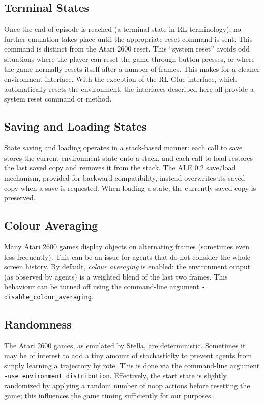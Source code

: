 \documentclass[12pt]{article}
\begin{document}
\subsection{Terminal States}

Once the end of episode is reached (a terminal state in RL terminology), no further emulation 
takes place until the appropriate reset command is sent. This command is distinct from the Atari 
2600 reset. This ``system reset'' avoids odd situations where the player can reset the game
through button presses, or where the game normally resets itself after a number of frames. This 
makes for a cleaner environment interface. With the exception of the RL-Glue interface, which 
automatically resets the environment, the interfaces described here all provide a system reset
command or method.

\subsection{Saving and Loading States}

State saving and loading operates in a stack-based manner: each call to save stores the current
environment state onto a stack, and each call to load restores the last saved copy and removes
it from the stack. The ALE 0.2 save/load mechanism, provided for backward compatibility, instead
overwrites its saved copy when a save is requested. When loading a state, the currently saved copy
is preserved.

\subsection{Colour Averaging}

Many Atari 2600 games display objects on alternating frames (sometimes even less frequently).
This can be an issue for agents that do not consider the whole screen history. By default, 
\emph{colour averaging} is enabled: the environment output (as observed by agents) is a weighted
blend of the last two frames. This behaviour can be turned off using the command-line argument 
\verb+-disable_colour_averaging+. 

\subsection{Randomness}

The Atari 2600 games, as emulated by Stella, are deterministic. Sometimes it may be of interest
to add a tiny amount of stochasticity to prevent agents from simply learning a trajectory by
rote. This is done via the command-line argument \verb+-use_environment_distribution+. Effectively,
the start state is slightly randomized by applying a random number of noop actions before
resetting the game; this influences the game timing sufficiently for our purposes.
\end{document}
